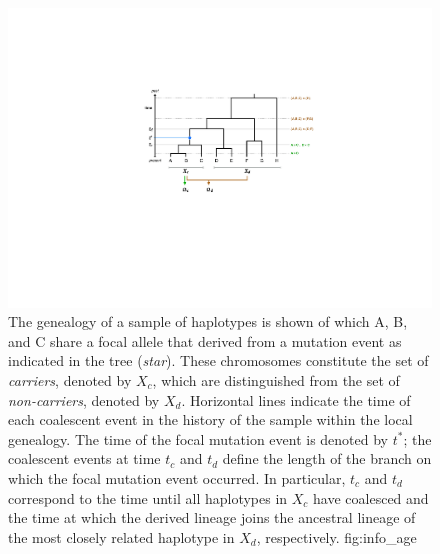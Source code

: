 

\begin{figure}[!htb]
\includegraphics[width=\textwidth]{./img/ch5/info_age}
%
{The genealogy of a sample of  haplotypes is shown of which A, B, and C share a focal allele that derived from a mutation event as indicated in the tree (\emph{star}).
These chromosomes constitute the set of \emph{carriers}, denoted by $X_c$, which are distinguished from the set of \emph{non-carriers}, denoted by $X_d$.
Horizontal lines indicate the time of each coalescent event in the history of the sample within the local genealogy.
The time of the focal mutation event is denoted by ${t^\ast}$; the  coalescent events at time $t_c$ and $t_d$ define the length of the branch on which the focal mutation event occurred.
In particular, $t_c$ and $t_d$ correspond to the time until all haplotypes in $X_c$ have coalesced and the time at which the derived lineage joins the ancestral lineage of the most closely related haplotype in $X_d$, respectively.}%
{fig:info_age}
\end{figure}


